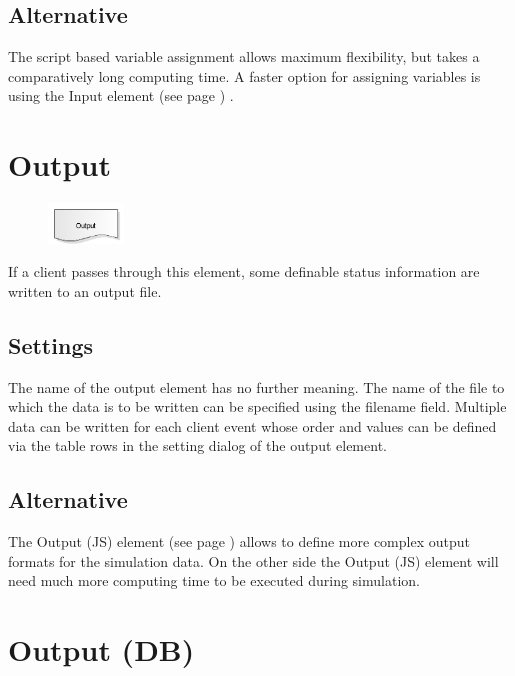 \subsection*{Alternative}

The script based variable assignment allows maximum flexibility, but takes a comparatively long
computing time. A faster option for assigning variables is using the
Input element (see page \pageref{ref:ModelElementInput}) .


\section{Output}
\label{ref:ModelElementOutput}

\begin{figure}
\vspace{-22pt}
\includegraphics[width=2cm]{imageModelElementOutput.png}
\vspace{-22pt}
\end{figure}

If a client passes through this element, some definable status information are written to an output file.

\subsection*{Settings}

The name of the output element has no further meaning. The name of the file to which the data is to be written
can be specified using the filename field. Multiple data can be written for each client event whose order and
values can be defined via the table rows in the setting dialog of the output element.

\subsection*{Alternative}

The Output (JS) element (see page \pageref{ref:ModelElementOutputJS}) allows to define more complex output formats
for the simulation data. On the other side the Output (JS) element will need much more computing time to be
executed during simulation.


\section{Output (DB)}
\label{ref:ModelElementOutputDB}

